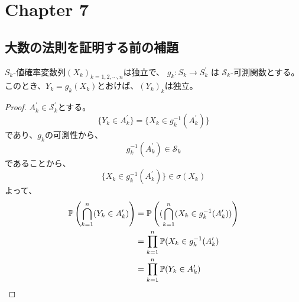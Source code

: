   \section{Chapter 7}
    \subsection{大数の法則を証明する前の補題}
      \begin{prop*}
        $S_k$-値確率変数列$(X_k)_{k = 1,2,\cdots, n}$は独立で、
        $g_k \colon S_k \to S_k^{\prime}$
        は
        $\mathcal{S}_k$-可測関数とする。
        このとき、$Y_k = g_k(X_k)$とおけば、$(Y_k)_k$は独立。
      \end{prop*}
      \begin{proof}
        $A_k^{\prime} \in \mathcal{S}_k^{\prime}$とする。
        \[
          \{Y_k \in A_k^{\prime}\} = \{X_k \in g_k^{-1}(A_k^{\prime})\}
        \]
        であり、$g_k$の可測性から、
        \[
          g_k^{-1}(A_k^{\prime}) \in \mathcal{S}_k
        \]
        であることから、
        \[
          \{X_k \in g_k^{-1}(A_k^{\prime})\} \in \sigma(X_k)
        \]
        よって、
        \begin{align*}
          {\mathbb{P}} \left(\bigcap_{k=1}^{n} (Y_k \in A_k^{\prime})\right) &= {\mathbb{P}} \left((\bigcap_{k=1}^{n} (X_k \in g_k^{-1}(A_k^{\prime}))\right) \\
          &= \prod_{k=1}^n {\mathbb{P}}(X_k \in g_k^{-1}(A_k^{\prime}) \\
          &= \prod_{k=1}^n {\mathbb{P}}(Y_k \in A_k^{\prime})
        \end{align*}
      \end{proof}

